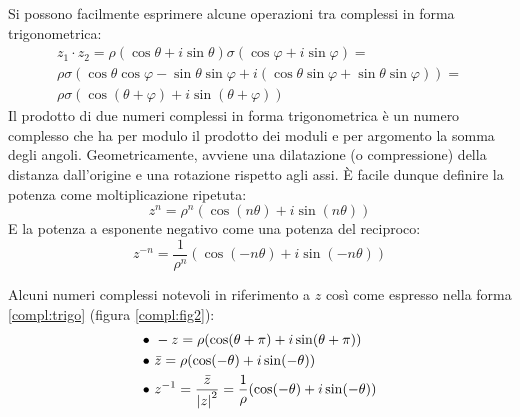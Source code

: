 Si possono facilmente esprimere alcune operazioni tra complessi in forma trigonometrica:
\begin{gather*}
	z_1\cdot z_2=\rho(\cos\theta+i\sin{\theta})\sigma(\cos\varphi+i\sin{\varphi})=\\
	\rho\sigma(\cos\theta\cos\varphi-\sin\theta\sin\varphi+i(\cos\theta\sin\varphi+\sin\theta\sin\varphi))=\\
	\rho\sigma(\cos(\theta+\varphi)+i\sin(\theta+\varphi))
\end{gather*}
Il prodotto di due numeri complessi in forma trigonometrica è un numero complesso che ha per modulo il prodotto dei moduli e per argomento la somma degli angoli. Geometricamente, avviene una dilatazione (o compressione) della distanza dall'origine e una rotazione rispetto agli assi. È facile dunque definire la potenza come moltiplicazione ripetuta:
\[
	z^n=\rho^n(\cos(n\theta)+i\sin(n\theta))
\]
E la potenza a esponente negativo come una potenza del reciproco:
\[
	z^{-n}=\frac{1}{\rho^{n}}(\cos(-n\theta)+i\sin(-n\theta))
\]

Alcuni numeri complessi notevoli in riferimento a $z$ così come espresso nella forma \ref{compl:trigo} (figura \vref{compl:fig2}):
\begin{align*}
	\bullet~ & -z=\rho(\cos(\theta+\pi)+i\sin(\theta+\pi))                                  \\
	\bullet~ & \bar z=\rho(\cos(-\theta)+i\sin(-\theta))                                    \\
	\bullet~ & z^{-1}=\frac{\bar z}{\left\lvert z \right\rvert^2}=\frac{1}{\rho}(\cos(-\theta)+i\sin(-\theta))
\end{align*}


